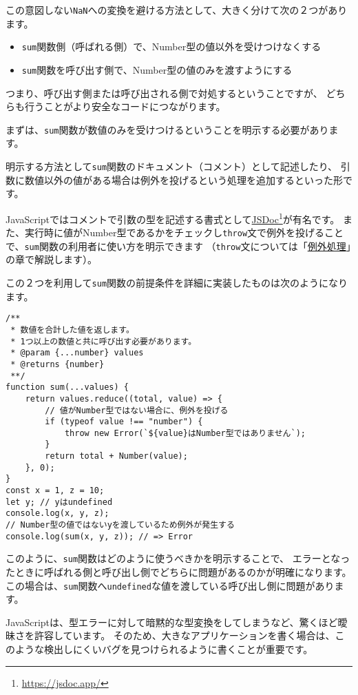 この意図しない\texttt{NaN}への変換を避ける方法として、大きく分けて次の２つがあります。

\begin{itemize}
\item
  \texttt{sum}関数側（呼ばれる側）で、Number型の値以外を受けつけなくする
\item
  \texttt{sum}関数を呼び出す側で、Number型の値のみを渡すようにする
\end{itemize}

つまり、呼び出す側または呼び出される側で対処するということですが、
どちらも行うことがより安全なコードにつながります。

まずは、\texttt{sum}関数が数値のみを受けつけるということを明示する必要があります。

明示する方法として\texttt{sum}関数のドキュメント（コメント）として記述したり、
引数に数値以外の値がある場合は例外を投げるという処理を追加するといった形です。

JavaScriptではコメントで引数の型を記述する書式として\href{https://jsdoc.app/}{JSDoc}\footnote{\url{https://jsdoc.app/}}が有名です。
また、実行時に値がNumber型であるかをチェックし\texttt{throw}文で例外を投げることで、\texttt{sum}関数の利用者に使い方を明示できます
（\texttt{throw}文については「\hyperlink{error-handling}{例外処理}」の章で解説します）。

この２つを利用して\texttt{sum}関数の前提条件を詳細に実装したものは次のようになります。

\begin{lstlisting}
/**
 * 数値を合計した値を返します。
 * 1つ以上の数値と共に呼び出す必要があります。
 * @param {...number} values
 * @returns {number}
 **/
function sum(...values) {
    return values.reduce((total, value) => {
        // 値がNumber型ではない場合に、例外を投げる
        if (typeof value !== "number") {
            throw new Error(`${value}はNumber型ではありません`);
        }
        return total + Number(value);
    }, 0);
}
const x = 1, z = 10;
let y; // yはundefined
console.log(x, y, z);
// Number型の値ではないyを渡しているため例外が発生する
console.log(sum(x, y, z)); // => Error
\end{lstlisting}

このように、\texttt{sum}関数はどのように使うべきかを明示することで、
エラーとなったときに呼ばれる側と呼び出し側でどちらに問題があるのかが明確になります。
この場合は、\texttt{sum}関数へ\texttt{undefined}な値を渡している呼び出し側に問題があります。

JavaScriptは、型エラーに対して暗黙的な型変換をしてしまうなど、驚くほど曖昧さを許容しています。
そのため、大きなアプリケーションを書く場合は、このような検出しにくいバグを見つけられるように書くことが重要です。

